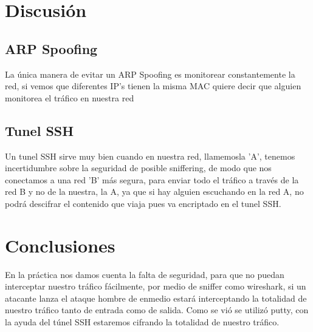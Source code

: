 \documentclass{article}
\begin{document}
\section{Discusi\'on}

\subsection{ARP Spoofing}
La \'unica manera de evitar un ARP Spoofing es monitorear constantemente la red, si vemos que diferentes IP's tienen la misma MAC quiere decir que alguien monitorea el tr\'afico en nuestra red
\subsection{Tunel SSH}

Un tunel SSH sirve muy bien cuando en nuestra red, llamemosla 'A', tenemos incertidumbre sobre la seguridad de posible sniffering, de modo que nos conectamos a una red 'B' m\'as segura, para enviar todo el tr\'afico a trav\'es de la red B y no de la nuestra, la A, ya que si hay alguien escuchando en la red A, no podr\'a descifrar el contenido que viaja pues va encriptado en el tunel SSH.

\section{Conclusiones}
En la pr\'actica nos damos cuenta la falta de seguridad, para que no puedan interceptar nuestro tr\'afico f\'acilmente, por medio de sniffer como wireshark, 
si un atacante lanza el ataque hombre de enmedio estar\'a interceptando la totalidad de nuestro tr\'afico tanto de entrada como de salida. Como se vi\'o se utiliz\'o putty, con la ayuda del túnel SSH estaremos cifrando la totalidad de nuestro tráfico.
\end{document}

